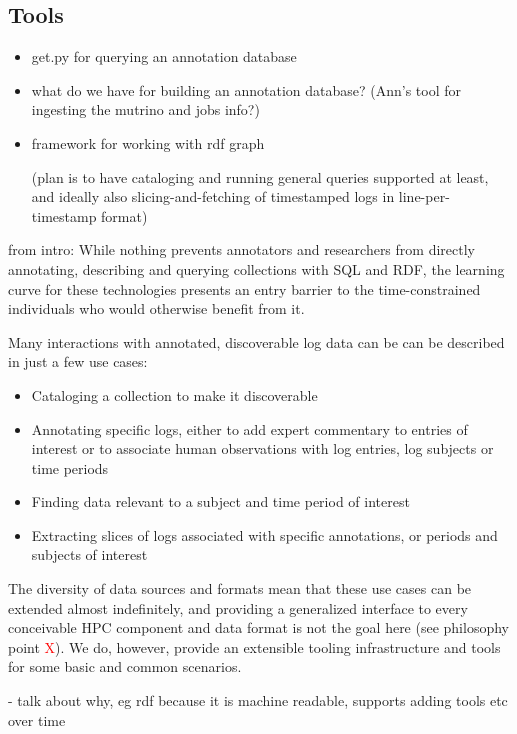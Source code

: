 \subsection{Tools}
\begin{itemize}
\item get.py for querying an annotation database
\item what do we have for building an annotation database? (Ann's tool for ingesting the mutrino and jobs info?)
\item framework for working with rdf graph

(plan is to have cataloging and running general queries supported at least, and ideally also slicing-and-fetching of timestamped logs in line-per-timestamp format)
\end{itemize}

from intro:
      While nothing prevents annotators and researchers from directly
      annotating, describing and querying collections with SQL and RDF,
      the learning curve for these technologies presents an entry
      barrier to the time-constrained individuals who would otherwise
      benefit from it.

      Many interactions with annotated, discoverable log data can be
      can be described in just a few use cases:

\begin{itemize}
\item Cataloging a collection to make it discoverable
\item Annotating specific logs, either to add expert commentary to
      entries of interest or to associate human observations with log
      entries, log subjects or time periods
\item Finding data relevant to a subject and time period of interest
\item Extracting slices of logs associated with specific annotations,
      or periods and subjects of interest
\end{itemize}

     The diversity of data sources and formats mean that these use cases
     can be extended almost indefinitely, and providing a generalized
     interface to every conceivable HPC component and data format is
     not the goal here (see philosophy point \textcolor{red}{X}). We
     do, however, provide an extensible tooling infrastructure and tools
     for some basic and common scenarios.



- talk about why, eg rdf because it is machine readable, supports adding tools etc over time 


